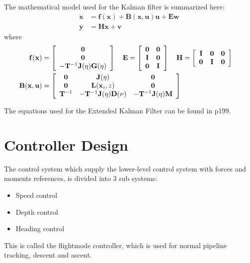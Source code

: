 	The mathematical model used for the Kalman filter is summarized here:
		\begin{align}
			\mathbf{\dot{x}} &= \mathbf{f(x)} + \mathbf{B(x, u) u} + \mathbf{E w} \\
			\mathbf{y} &= \mathbf{H x} + \mathbf{v}
		\end{align}
	where
		\begin{align}
			\mathbf{f(x)} &= \left[ \begin{array}{c}
						\mathbf{0}\\
						\mathbf{0}\\
						-\mathbf{T}^{-1} \mathbf{J}(\mathbf{\eta}) \mathbf{G}(\mathbf{\eta})
						\end{array} \right] \quad 
			\mathbf{E} = \left[ \begin{array}{cc}
			                      	\mathbf{0} & \mathbf{0} \\
			                      	\mathbf{I} & \mathbf{0}\\
			                      	\mathbf{0} & \mathbf{I}
			                     \end{array} \right] \quad
			\mathbf{H} = \left[ \begin{array}{ccc}
			                      	\mathbf{I} & \mathbf{0} & \mathbf{0}\\
			                      	\mathbf{0} & \mathbf{I} & \mathbf{0}
			                     \end{array} \right] \\
			\mathbf{B(x, u)} &= \left[ \begin{array}{ccc}
			                      	\mathbf{0} & \mathbf{J}(\mathbf{\eta}) & \mathbf{0}\\
			                      	\mathbf{0} & \mathbf{L}(\mathbf{x}_i, z) & \mathbf{0}\\
			                      	\mathbf{T}^{-1} & -\mathbf{T}^{-1}\mathbf{J}(\mathbf{\eta}) \mathbf{D(\nu)} & -\mathbf{T}^{-1} \mathbf{J}(\mathbf{\eta}) \mathbf{M}
			                     \end{array} \right] &
		\end{align}

	The equations used for the Extended Kalman Filter can be found in \cite{fossen} p199.
	
\section{Controller Design}
	The control system which supply the lower-level control system with forces and moments references, is divided into 3 sub systems:
		\begin{itemize}
		 \item Speed control
		 \item Depth control
		 \item Heading control
		\end{itemize}
	This is called the flightmode controller, which is used for normal pipeline tracking, descent and ascent. 
	

